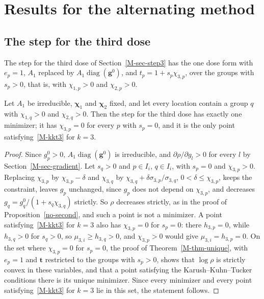 \section{Results for the alternating method}\label{app-alt}

\subsection{The step for the third dose}\label{app-third}

The step for the third dose of Section~\ref{M-sec-step3} has the one dose form
with $e_p=1$, $A_1$ replaced by $A_1\operatorname{diag}(\bm g^0)$, and
$t_p=1+s_p\chi_{3,p}$, over the groups with $s_p>0$, that is, with
$\chi_{1,p}>0$ and $\chi_{2,p}>0$.

\begin{proposition}\label{third-unique}
Let $A_1$ be irreducible, $\bm\chi_1$ and $\bm\chi_2$ fixed, and let every
location contain a group $q$ with $\chi_{1,q}>0$ and $\chi_{2,q}>0$. Then the
step for the third dose has exactly one minimizer; it has $\chi_{3,p}=0$ for
every $p$ with $s_p=0$, and it is the only point satisfying~\eqref{M-kkt3} for
$k=3$.
\end{proposition}
\begin{proof}
Since $g_p^0>0$, $A_1\operatorname{diag}(\bm g^0)$ is irreducible, and
$\partial\rho/\partial g_l>0$ for every $l$ by Section~\ref{M-sec-gradient}. Let
$s_q>0$ and $p\in I_i$, $q\in I_i$, with $s_p=0$ and $\chi_{3,p}>0$. Replacing
$\chi_{3,p}$ by $\chi_{3,p}-\delta$ and $\chi_{3,q}$ by
$\chi_{3,q}+\delta\sigma_{3,p}/\sigma_{3,q}$, $0<\delta\le\chi_{3,p}$, keeps the
constraint, leaves $g_p$ unchanged, since $g_p$ does not depend on
$\chi_{3,p}$, and decreases $g_q=g_q^0/(1+s_q\chi_{3,q})$ strictly. So $\rho$
decreases strictly, as in the proof of Proposition~\ref{no-second}, and such a
point is not a minimizer. A point satisfying~\eqref{M-kkt3} for $k=3$ also has
$\chi_{3,p}=0$ for $s_p=0$: there $h_{3,p}=0$, while $h_{3,q}>0$ for $s_q>0$,
so $\mu_{3,i}\ge h_{3,q}>0$, and $\chi_{3,p}>0$ would give
$\mu_{3,i}=h_{3,p}=0$. On the set where $\chi_{3,p}=0$ for $s_p=0$, the proof
of Theorem~\ref{M-thm-unique}, with $e_p=1$ and $\bm t$ restricted to the groups
with $s_p>0$, shows that $\log\rho$ is strictly convex in these variables, and
that a point satisfying the Karush--Kuhn--Tucker conditions there is its
unique minimizer. Since every minimizer and every point
satisfying~\eqref{M-kkt3} for $k=3$ lie in this set, the statement follows.
\end{proof}

